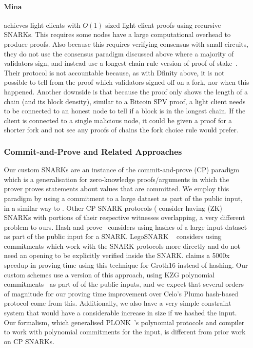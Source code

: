 \paragraph{Mina~\cite{mina}} achieves light clients with $O(1)$ sized light client proofs using recursive SNARKs. This requires some nodes have a large computational overhead to produce proofs. Also because this requires verifying consensus with small circuits, they do not use the consensus paradigm
discussed above where a majority of validators sign, and instead use a longest chain rule version of proof of stake~\cite{mina}.
Their protocol is not accountable because, as with Dfinity above, it is not possible to tell from the proof which validators signed off on a fork, nor when this happened.
Another downside is that because the proof only shows the length of a chain (and its block density), similar to a Bitcoin SPV proof, a light client needs to be
connected to an honest node to tell if a block is in the longest chain. If the client is connected to a single malicious node, it could be given a proof for a
shorter fork and not see any proofs of chains the fork choice rule would prefer.

\vspace{-0.3cm}
\subsubsection{Commit-and-Prove and Related Approaches}
\label{sec:commit_prove}

\noindent Our custom SNARKs are an instance of the commit-and-prove (CP) paradigm~\cite{KilianPhD,CLOS02,CP_proposal,HP_paper,CP_paper,lunar,eclipse}
which is a generalisation for zero-knowledge proofs/arguments in which the prover proves statements about values that are committed. We employ this paradigm by 
using a commitment to a large dataset as part of the public input, in a similar way to \cite{HP_paper,CP_paper}. Other CP SNARK protocols (\cite{CP_paper,interoperability_2,lunar,eclipse} 
consider having (ZK) SNARKs with portions of their respective witnesses overlapping, a very different problem to ours. Hash-and-prove~\cite{HP_paper} considers using hashes of a large 
input dataset as part of the public input for a SNARK. LegoSNARK ~\cite{CP_paper} considers using commitments which work with the SNARK protocols more directly and do not need an 
opening to be explicitly verified inside the SNARK. \cite{CP_paper} claims a 5000x speedup in proving time using this technique for Groth16 instead of hashing. Our custom schemes use 
a version of this approach, using KZG polynomial commitments~\cite{KZG_10} as part of of the public inputs, and we expect that several orders of magnitude for our proving time improvement 
over Celo's Plumo hash-based protocol come from this. Additionally, we also have a very simple constraint system that would have a considerable increase in size if we hashed the input.
Our formalism, which generalised PLONK~\cite{plonk}'s polynomial protocols and compiler to work with polynomial commitments for the input, is different from prior work on CP SNARKs.

